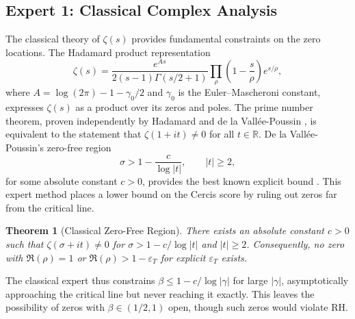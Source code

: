 \documentclass[12pt,a4paper]{article}
\newtheorem{theorem}{Theorem}[section]
\theoremstyle{remark}
\newcommand{\R}{\mathbb{R}}
\begin{document}
\subsection{Expert 1: Classical Complex Analysis}
\label{sec:expert1}
The classical theory of $\zeta(s)$ provides fundamental constraints on the
zero locations. The Hadamard product representation \cite{Hadamard1893}
\[
\zeta(s) = \frac{e^{As}}{2(s-1)\Gamma(s/2 + 1)}
\prod_{\rho} \left(1 - \frac{s}{\rho}\right) e^{s/\rho},
\]
where $A = \log(2\pi) - 1 - \gamma_0/2$ and $\gamma_0$ is the Euler--Mascheroni
constant, expresses $\zeta(s)$ as a product over its zeros and poles.
The prime number theorem, proven independently by Hadamard \cite{Hadamard1896}
and de la Vall\'ee-Poussin \cite{ValleePoussin1896}, is equivalent to the
statement that $\zeta(1 + it) \neq 0$ for all $t \in \R$. De la
Vall\'ee-Poussin's zero-free region
\[
\sigma > 1 - \frac{c}{\log|t|}, \qquad |t| \geq 2,
\]
for some absolute constant $c > 0$, provides the best known explicit
bound \cite{Ford2002}. This expert method places a lower bound on the
Cercis score by ruling out zeros far from the critical line.
\begin{theorem}[Classical Zero-Free Region]
\label{thm:zerofree}
There exists an absolute constant $c > 0$ such that $\zeta(\sigma + it) \neq 0$
for $\sigma > 1 - c/\log|t|$ and $|t| \geq 2$. Consequently, no zero with
$\Re(\rho) = 1$ or $\Re(\rho) > 1 - \varepsilon_T$ for explicit
$\varepsilon_T$ exists.
\end{theorem}
The classical expert thus constrains $\beta \leq 1 - c/\log|\gamma|$ for
large $|\gamma|$, asymptotically approaching the critical line but never
reaching it exactly. This leaves the possibility of zeros with
$\beta \in (1/2, 1)$ open, though such zeros would violate RH.
\end{document}
